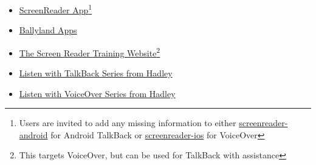 \begin{itemize}
 \begin{itemize}
  \item \href{https://screenreader.app/}{ScreenReader App}\footnote{\raggedright Users are invited to add any missing information to either \href{https://github.com/appt-org/screenreader-android}{screenreader-android} for Android TalkBack or \href{https://github.com/appt-org/screenreader-ios}{screenreader-ios} for VoiceOver}
  \item \href{https://www.sonokids.org/ballyland-early-learning/ballyland-game-apps/}{Ballyland Apps}
  \item \href{https://srt.csb-cde.ca.gov/}{The Screen Reader Training Website}\footnote{\raggedright This targets VoiceOver, but can be used for TalkBack with assistance}
  \item \href{https://hadley.edu/workshops/listen-with-talkback-series}{Listen with TalkBack Series from Hadley}
  \item \href{https://hadley.edu/workshops/listen-with-voiceover-series}{Listen with VoiceOver Series from Hadley}
 \end{itemize}


\end{itemize}
